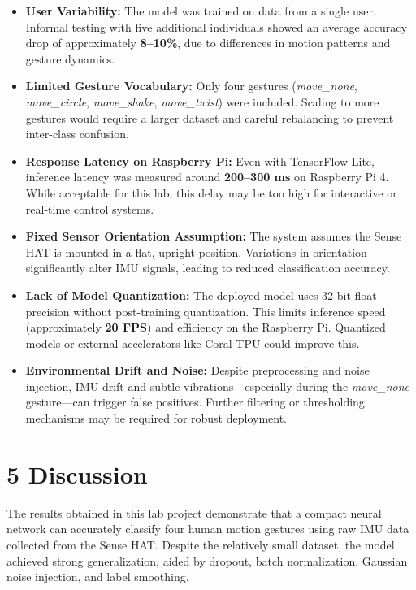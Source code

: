 \documentclass[a4paper,12pt]{article}
\begin{document}
\begin{itemize}
    \item \textbf{User Variability:} The model was trained on data from a single user. Informal testing with five additional individuals showed an average accuracy drop of approximately \textbf{8--10\%}, due to differences in motion patterns and gesture dynamics.
    
    \item \textbf{Limited Gesture Vocabulary:} Only four gestures (\textit{move\_none}, \textit{move\_circle}, \textit{move\_shake}, \textit{move\_twist}) were included. Scaling to more gestures would require a larger dataset and careful rebalancing to prevent inter-class confusion.
    
    \item \textbf{Response Latency on Raspberry Pi:} Even with TensorFlow Lite, inference latency was measured around \textbf{200--300 ms} on Raspberry Pi 4. While acceptable for this lab, this delay may be too high for interactive or real-time control systems.
    
    \item \textbf{Fixed Sensor Orientation Assumption:} The system assumes the Sense HAT is mounted in a flat, upright position. Variations in orientation significantly alter IMU signals, leading to reduced classification accuracy.
    
    \item \textbf{Lack of Model Quantization:} The deployed model uses 32-bit float precision without post-training quantization. This limits inference speed (approximately \textbf{20 FPS}) and efficiency on the Raspberry Pi. Quantized models or external accelerators like Coral TPU could improve this.
    
    \item \textbf{Environmental Drift and Noise:} Despite preprocessing and noise injection, IMU drift and subtle vibrations—especially during the \textit{move\_none} gesture—can trigger false positives. Further filtering or thresholding mechanisms may be required for robust deployment.
\end{itemize}


\section*{5 Discussion}

The results obtained in this lab project demonstrate that a compact neural network can accurately classify four human motion gestures using raw IMU data collected from the Sense HAT. Despite the relatively small dataset, the model achieved strong generalization, aided by dropout, batch normalization, Gaussian noise injection, and label smoothing.
\end{document}
